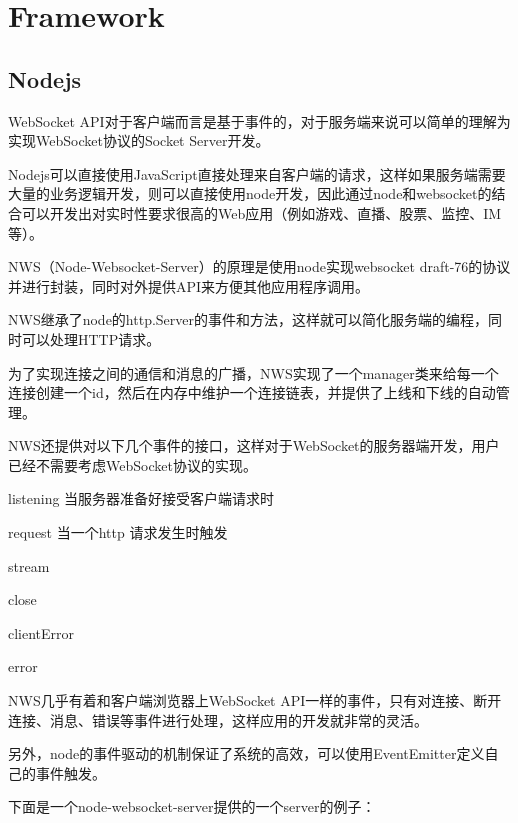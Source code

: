 \chapter{Framework}


\section{Nodejs}

WebSocket API对于客户端而言是基于事件的，对于服务端来说可以简单的理解为实现WebSocket协议的Socket Server开发。


Nodejs可以直接使用JavaScript直接处理来自客户端的请求，这样如果服务端需要大量的业务逻辑开发，则可以直接使用node开发，因此通过node和websocket的结合可以开发出对实时性要求很高的Web应用（例如游戏、直播、股票、监控、IM等）。

NWS（Node-Websocket-Server）的原理是使用node实现websocket draft-76的协议并进行封装，同时对外提供API来方便其他应用程序调用。

NWS继承了node的http.Server的事件和方法，这样就可以简化服务端的编程，同时可以处理HTTP请求。

为了实现连接之间的通信和消息的广播，NWS实现了一个manager类来给每一个连接创建一个id，然后在内存中维护一个连接链表，并提供了上线和下线的自动管理。

NWS还提供对以下几个事件的接口，这样对于WebSocket的服务器端开发，用户已经不需要考虑WebSocket协议的实现。


\begin{compactitem}
\item listening 当服务器准备好接受客户端请求时
\item request 当一个http 请求发生时触发
\item stream
\item close
\item clientError
\item error
\end{compactitem}

NWS几乎有着和客户端浏览器上WebSocket API一样的事件，只有对连接、断开连接、消息、错误等事件进行处理，这样应用的开发就非常的灵活。

另外，node的事件驱动的机制保证了系统的高效，可以使用EventEmitter定义自己的事件触发。





下面是一个node-websocket-server提供的一个server的例子：

